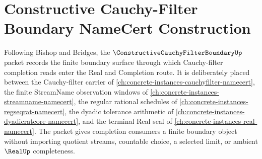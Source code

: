 \chapter{Constructive Cauchy-Filter Boundary NameCert Construction}
\label{ch:concrete-instances-constructive-cauchy-filter-boundary-namecert}

Following Bishop and Bridges, the $\ConstructiveCauchyFilterBoundaryUp$ packet records the finite boundary surface through which Cauchy-filter completion reads enter the Real and Completion route. It is deliberately placed between the Cauchy-filter carrier of \autoref{ch:concrete-instances-cauchyfilter-namecert}, the finite StreamName observation windows of \autoref{ch:concrete-instances-streamname-namecert}, the regular rational schedules of \autoref{ch:concrete-instances-regseqrat-namecert}, the dyadic tolerance arithmetic of \autoref{ch:concrete-instances-dyadicratcore-namecert}, and the terminal Real seal of \autoref{ch:concrete-instances-real-namecert}. The packet gives completion consumers a finite boundary object without importing quotient streams, countable choice, a selected limit, or ambient $\RealUp$ completeness.

